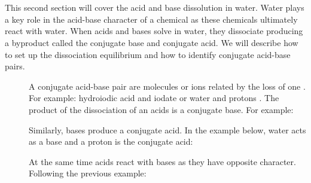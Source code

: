 \documentclass[main.tex]{subfiles}
\begin{document}
\section{\color{blue!30!black}{Dissociation of acids \& bases}}
This second section will cover the acid and base dissolution in water. Water plays a key role in the acid-base character of a chemical as these chemicals ultimately react with water. When acids and bases solve in water, they dissociate producing a byproduct called the conjugate base and conjugate acid. We will describe how to set up the dissociation equilibrium and how to identify conjugate acid-base pairs. 
\sloppy\begin{description}

\item[] A conjugate acid-base pair are molecules or ions related by the loss of one . For example: hydroiodic acid  and iodate  or water  and protons . The product of the dissociation of an acids is a conjugate base. For example:
\begin{center}\end{center}
Similarly, bases produce a conjugate acid. In the example below, water acts as a base and a proton is the conjugate acid:

\begin{center}\end{center}



At the same time acids react with bases as they have opposite character. Following the previous example:
\begin{center}\end{center}



\end{description}
\end{document}

